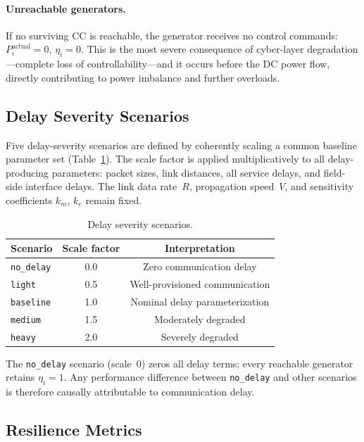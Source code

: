 \documentclass[a4paper,fleqn]{cas-dc}
\newcommand{\nodelay}{\texttt{no\_delay}}
\begin{document}
\paragraph{Unreachable generators.}
If no surviving CC is reachable, the generator receives no control
commands: $P_i^{\text{actual}}=0$, $\eta_i=0$.  This is the most severe
consequence of cyber-layer degradation---complete loss of
controllability---and it occurs before the DC power flow, directly
contributing to power imbalance and further overloads.

\subsection{Delay Severity Scenarios}\label{sec:scenarios}

Five delay-severity scenarios are defined by coherently scaling a common
baseline parameter set (Table~\ref{tbl:scenarios}).  The scale factor is
applied multiplicatively to all delay-producing parameters: packet
sizes, link distances, all service delays, and field-side interface
delays.  The link data rate~$R$, propagation speed~$V$, and sensitivity
coefficients $k_m$, $k_e$ remain fixed.

\begin{table}[t]
\caption{Delay severity scenarios.}\label{tbl:scenarios}
\centering
\begin{tabular}{@{}lcc@{}}
\toprule
Scenario & Scale factor & Interpretation \\
\midrule
\texttt{no\_delay} & 0.0 & Zero communication delay \\
\texttt{light}     & 0.5 & Well-provisioned communication \\
\texttt{baseline}  & 1.0 & Nominal delay parameterization \\
\texttt{medium}    & 1.5 & Moderately degraded \\
\texttt{heavy}     & 2.0 & Severely degraded \\
\bottomrule
\end{tabular}
\end{table}

The \nodelay{} scenario (scale~0) zeros all delay terms; every reachable
generator retains $\eta_i=1$.  Any performance difference between
\nodelay{} and other scenarios is therefore causally attributable to
communication delay.

\subsection{Resilience Metrics}\label{sec:metrics}
\end{document}
